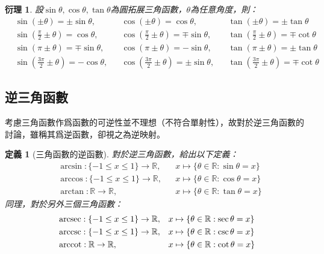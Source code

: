 \documentclass[12pt]{article}
\newtheorem{definition}{定義}
\newtheorem*{corollary}{衍理}
\begin{document}
    \begin{corollary}
        設$\sin{\theta},\cos{\theta},\tan{\theta}$為圓拓展三角函數，$\theta$為任意角度，則：\begin{align*}
            &\sin(\pm\theta)=\pm\sin{\theta},&&\cos(\pm\theta)=\cos{\theta},&&\tan(\pm\theta)=\pm\tan{\theta}\\
            &\sin(\frac{\pi}{2}\pm\theta)=\cos{\theta},&&\cos(\frac{\pi}{2}\pm\theta)=\mp\sin{\theta},&&\tan(\frac{\pi}{2}\pm\theta)=\mp\cot{\theta}\\
            &\sin(\pi\pm\theta)=\mp\sin{\theta},&&\cos(\pi\pm\theta)=-\sin{\theta},&&\tan(\pi\pm\theta)=\pm\tan{\theta}\\
            &\sin(\frac{3\pi}{2}\pm\theta)=-\cos{\theta},&&\cos(\frac{3\pi}{2}\pm\theta)=\pm\sin{\theta},&&\tan(\frac{3\pi}{2}\pm\theta)=\mp\cot{\theta}
        \end{align*}
    \end{corollary}

    \subsection*{逆三角函數}

    考慮三角函數作爲函數的可逆性並不理想（不符合單射性），故對於逆三角函數的討論，雖稱其爲逆函數，卻視之為逆映射。

    \begin{definition}[三角函數的逆函數]
        對於逆三角函數，給出以下定義：\begin{align*}
            &\arcsin:\{-1\leq x\leq 1\}\to\mathbb{R},&&x\mapsto\{\theta\in\mathbb{R}:\sin{\theta}=x\}\\
            &\arccos:\{-1\leq x\leq 1\}\to\mathbb{R},&&x\mapsto\{\theta\in\mathbb{R}:\cos{\theta}=x\}\\
            &\arctan:\mathbb{R}\to\mathbb{R},&&x\mapsto\{\theta\in\mathbb{R}:\tan{\theta}=x\}
        \end{align*}
        同理，對於另外三個三角函數：\begin{align*}
            &\arcsec:\{-1\leq x\leq 1\}\to\mathbb{R},&&x\mapsto\{\theta\in\mathbb{R}:\sec{\theta}=x\}\\
            &\arccsc:\{-1\leq x\leq 1\}\to\mathbb{R},&&x\mapsto\{\theta\in\mathbb{R}:\csc{\theta}=x\}\\
            &\arccot:\mathbb{R}\to\mathbb{R},&&x\mapsto\{\theta\in\mathbb{R}:\cot{\theta}=x\}
        \end{align*}
    \end{definition}
\end{document}
